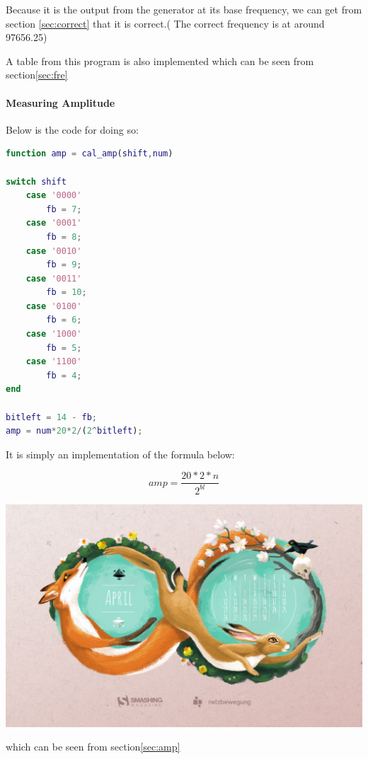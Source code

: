 \documentclass[11pt]{scrartcl}
\begin{document}
Because it is the output from the generator at its base frequency, we can get from section \ref{sec:correct} that it is correct.( The correct frequency is at around 97656.25)

A table from this program is also implemented which can be seen from section\ref{sec:fre}

\paragraph{Measuring Amplitude}
Below is the code for doing so:

\begin{lstlisting}[language=Matlab]
function amp = cal_amp(shift,num)

switch shift
    case '0000'
        fb = 7;
    case '0001'
        fb = 8;
    case '0010'
        fb = 9;
    case '0011'
        fb = 10;
    case '0100'
        fb = 6;
    case '1000'
        fb = 5;
    case '1100'
        fb = 4;
end

bitleft = 14 - fb;
amp = num*20*2/(2^bitleft);
\end{lstlisting}
It is simply an implementation of the formula below:

$$amp = \frac{20*2*n}{2^{bl}}$$
\begin{center}     
\begin{minipage}[t]{\linewidth}

{
\includegraphics[scale = 0.1]{apr.jpg}
}
\end{minipage}
\medskip
\end{center}
which can be seen from section\ref{sec:amp}
\end{document}

